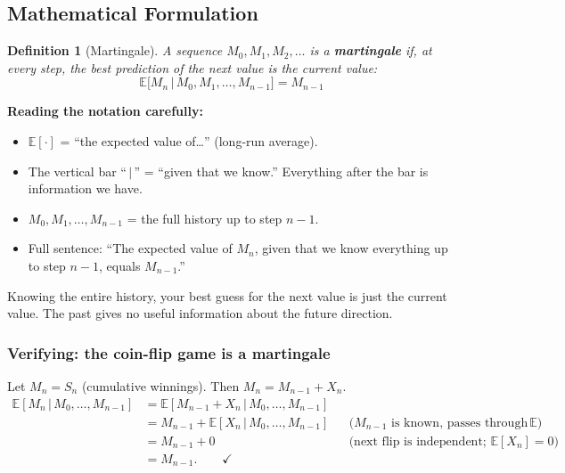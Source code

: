 \documentclass[12pt, a4paper]{article}
\newtheorem{definition}{Definition}
\newcommand{\E}{\mathbb{E}}            %
\newcommand{\given}{\,\vert\,}         %
\begin{document}
\subsection{Mathematical Formulation}

\begin{definition}[Martingale]
A sequence $M_0, M_1, M_2, \ldots$ is a \textbf{martingale} if, at every
step, the best prediction of the next value is the current value:
\[
  \boxed{\E\bigl[M_n \given M_0, M_1, \ldots, M_{n-1}\bigr] = M_{n-1}}
\]
\end{definition}

\textbf{Reading the notation carefully:}
\begin{itemize}[nosep]
  \item $\E[\cdot]$ = ``the expected value of\ldots'' (long-run average).
  \item The vertical bar ``$\given$'' = ``given that we know.''
        Everything after the bar is information we have.
  \item $M_0, M_1, \ldots, M_{n-1}$ = the full history up to step $n-1$.
  \item Full sentence: ``The expected value of $M_n$, given that we know
        everything up to step $n-1$, equals $M_{n-1}$.''
\end{itemize}

\begin{plainlanguage}
Knowing the entire history, your best guess for the next value is just the
current value.  The past gives no useful information about the future direction.
\end{plainlanguage}

\subsubsection*{Verifying: the coin-flip game is a martingale}

Let $M_n = S_n$ (cumulative winnings).  Then $M_n = M_{n-1} + X_n$.
\begin{align*}
  \E[M_n \given M_0,\ldots,M_{n-1}]
  &= \E[M_{n-1} + X_n \given M_0,\ldots,M_{n-1}] \\
  &= M_{n-1} + \E[X_n \given M_0,\ldots,M_{n-1}]
     & &\text{($M_{n-1}$ is known, passes through $\E$)} \\
  &= M_{n-1} + 0
     & &\text{(next flip is independent; $\E[X_n]=0$)} \\
  &= M_{n-1}. \qquad\checkmark
\end{align*}
\end{document}
